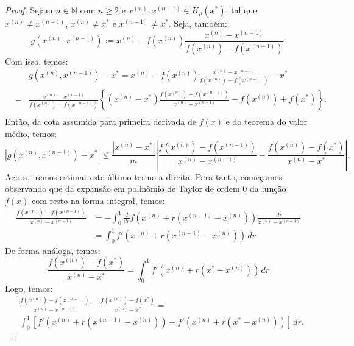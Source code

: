 \begin{proof}
  Sejam $n\in\mathbb{N}$ com $n\geq 2$ e $x^{(n)}, x^{(n-1)}\in K_\rho(x^*)$, tal que $x^{(n)}\neq x^{(n-1)}$, $x^{(n)}\neq x^*$ e $x^{(n-1)}\neq x^*$. Seja, também:
  \begin{equation}
    g(x^{(n)},x^{(n-1)}) := x^{(n)} - f(x^{(n)})\frac{x^{(n)} - x^{(n-1)}}{f(x^{(n)}) - f(x^{(n-1)})}.
  \end{equation}
Com isso, temos:
  \begin{eqnarray}
    &&g(x^{(n)},x^{(n-1)}) - x^* = x^{(n)} - f(x^{(n)})\frac{x^{(n)} - x^{(n-1)}}{f(x^{(n)}) - f(x^{(n-1)})} - x^*\\
    &=& \frac{x^{(n)} - x^{(n-1)}}{f(x^{(n)}) - f(x^{(n-1)})}\left\{(x^{(n)} - x^*)\frac{f(x^{(n)}) - f(x^{(n-1)})}{x^{(n)} - x^{(n-1)}} - f(x^{(n)}) + f(x^*)\right\}.\\
  \end{eqnarray}
Então, da cota assumida para primeira derivada de $f(x)$ e do teorema do valor médio, temos:
\begin{equation}\label{eq:secantes-est0}
  |g(x^{(n)},x^{(n-1)}) - x^*| \leq \frac{|x^{(n)} - x^*|}{m}\left|\frac{f(x^{(n)}) - f(x^{(n-1)})}{x^{(n)} - x^{(n-1)}} - \frac{f(x^{(n)}) - f(x^*)}{x^{(n)} - x^*}\right|.
\end{equation}
Agora, iremos estimar este último termo a direita. Para tanto, começamos observando que da expansão em polinômio de Taylor de ordem $0$ da função $f(x)$ com resto na forma integral, temos:
\begin{eqnarray}
  \frac{f(x^{(n)}) - f(x^{(n-1)})}{x^{(n)} - x^{(n-1)}} &= -\int_0^1 \frac{d}{dr}f(x^{(n)} + r(x^{(n-1)} - x^{(n)}))\frac{dr}{x^{(n)} - x^{(n-1)}}\\
  &= \int_0^1 f'(x^{(n)} + r(x^{(n-1)} - x^{(n)}))\,dr
\end{eqnarray}
De forma análoga, temos:
\begin{equation}
  \frac{f(x^{(n)}) - f(x^*)}{x^{(n)} - x^*} = \int_0^1 f'(x^{(n)} + r(x^* - x^{(n)}))\,dr
\end{equation}
Logo, temos:
\begin{equation}\label{eq:secantes-0}
  \begin{split}
  &\frac{f(x^{(n)}) - f(x^{(n-1)})}{x^{(n)} - x^{(n-1)}} - \frac{f(x^{(n)}) - f(x^*)}{x^{(n)} - x^*} = \\
  &\int_0^1 \left[f'(x^{(n)} + r(x^{(n-1)} - x^{(n)})) - f'(x^{(n)} + r(x^* - x^{(n)}))\right]\,dr.
  \end{split}
\end{equation}

\end{proof}
